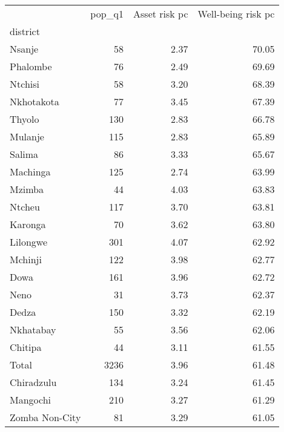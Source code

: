 \begin{tabular}{lrrr}
\toprule
{} &  pop\_q1 &  Asset risk pc &  Well-being risk pc \\
district       &         &                &                     \\
\midrule
Nsanje         &      58 &           2.37 &               70.05 \\
Phalombe       &      76 &           2.49 &               69.69 \\
Ntchisi        &      58 &           3.20 &               68.39 \\
Nkhotakota     &      77 &           3.45 &               67.39 \\
Thyolo         &     130 &           2.83 &               66.78 \\
Mulanje        &     115 &           2.83 &               65.89 \\
Salima         &      86 &           3.33 &               65.67 \\
Machinga       &     125 &           2.74 &               63.99 \\
Mzimba         &      44 &           4.03 &               63.83 \\
Ntcheu         &     117 &           3.70 &               63.81 \\
Karonga        &      70 &           3.62 &               63.80 \\
Lilongwe       &     301 &           4.07 &               62.92 \\
Mchinji        &     122 &           3.98 &               62.77 \\
Dowa           &     161 &           3.96 &               62.72 \\
Neno           &      31 &           3.73 &               62.37 \\
Dedza          &     150 &           3.32 &               62.19 \\
Nkhatabay      &      55 &           3.56 &               62.06 \\
Chitipa        &      44 &           3.11 &               61.55 \\
Total          &    3236 &           3.96 &               61.48 \\
Chiradzulu     &     134 &           3.24 &               61.45 \\
Mangochi       &     210 &           3.27 &               61.29 \\
Zomba Non-City &      81 &           3.29 &               61.05 \\

\end{tabular}
